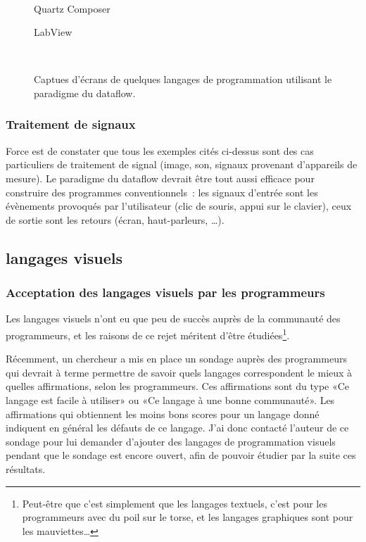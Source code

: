 \documentclass{article}
\begin{document}
\begin{figure}[ht]
  
  {\,}
  \hfill 
  \begin{minipage}{5cm}
    \centering
    \caption{Quartz Composer\cite{quartz-composer}}
    \label{fig:quartz-composer}
  \end{minipage}
  \hfill
  \begin{minipage}{5cm}
    \centering
    \caption{LabView\cite{labview}}
  \end{minipage}
  \hfill
  {\,} 
  \caption{Captues d'écrans de quelques langages de programmation utilisant le paradigme du dataflow.}
  \label{fig:screenshots}
\end{figure}

\subsubsection{Traitement de signaux}

Force est de constater que tous les exemples cités ci-dessus sont des cas particuliers de traitement de signal (image, son, signaux
provenant d'appareils de mesure). Le paradigme du dataflow devrait être tout aussi efficace pour construire des programmes conventionnels~:
les signaux d'entrée sont les évènements provoqués par l'utilisateur (clic de souris, appui sur le clavier), ceux de sortie sont les retours
(écran, haut-parleurs, \dots).

\subsection{langages visuels}

\subsubsection[Acceptation par les programmeurs]{Acceptation des langages visuels par les programmeurs}
Les langages visuels n'ont eu que peu de succès auprès de la communauté des programmeurs, et les raisons de ce rejet méritent d'être
étudiées\footnote{Peut-être que c'est simplement que les langages textuels, c'est pour les programmeurs avec du poil sur le torse, et les
  langages graphiques sont pour les mauviettes…}.

Récemment, un chercheur a mis en place un sondage auprès des programmeurs qui devrait à terme permettre de savoir quels langages
correspondent le mieux à quelles affirmations, selon les programmeurs\cite{the-right-tool}. Ces affirmations sont du type «Ce langage est
facile à utiliser» ou «Ce langage à une bonne communauté». Les affirmations qui obtiennent les moins bons scores pour un langage donné
indiquent en général les défauts de ce langage. J'ai donc contacté l'auteur de ce sondage pour lui demander d'ajouter des langages de
programmation visuels pendant que le sondage est encore ouvert, afin de pouvoir étudier par la suite ces résultats.
\end{document}
